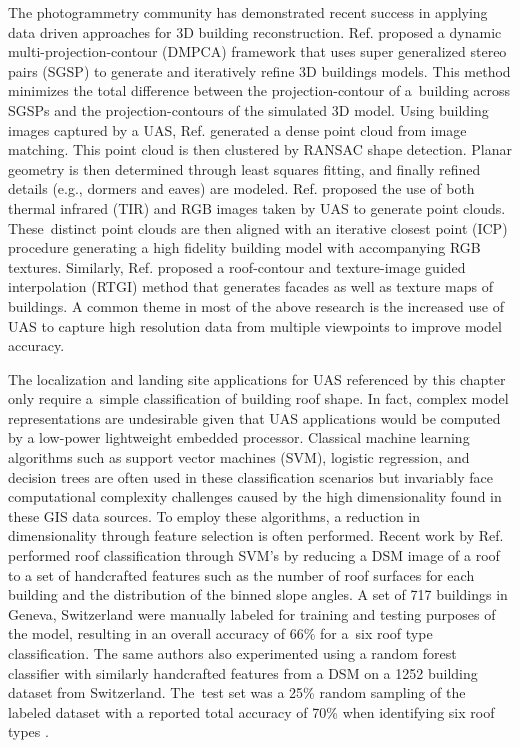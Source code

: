  {The photogrammetry community has demonstrated recent success in applying data driven approaches for 3D building reconstruction. Ref. \cite{yan_dynamic_2017} proposed a dynamic multi-projection-contour (DMPCA) framework that uses super generalized stereo pairs (SGSP) to generate and iteratively refine 3D buildings models. This method minimizes the total difference between the projection-contour of a~building across SGSPs and the projection-contours of the simulated 3D model. Using building images captured by a UAS, Ref. \cite{malihi_3d_2016} generated a dense point cloud from image matching. This point cloud is then clustered by RANSAC shape detection. Planar geometry is then determined through least squares fitting, and finally refined details (e.g., dormers and eaves) are modeled.  Ref. \cite{maset_photogrammetric_2017} proposed the use of both thermal infrared (TIR) and RGB images taken by UAS to generate point clouds. These~distinct point clouds are then aligned with an iterative closest point (ICP) procedure generating a high fidelity building model with accompanying RGB textures. Similarly,            Ref. \cite{yan_hierarchical_2017} proposed a roof-contour and texture-image guided interpolation (RTGI) method that generates facades as well as texture maps of buildings. A common theme in most of the above research is the increased use of UAS to capture high resolution data from multiple viewpoints to improve model accuracy.}
 
The localization and landing site applications for UAS referenced by this chapter only require a~simple classification of building roof shape.   In fact, complex model representations are undesirable given that UAS applications would be computed by a low-power lightweight embedded processor. Classical machine learning algorithms such as support vector machines (SVM), logistic regression, and decision trees are often used in these classification scenarios but invariably face computational complexity challenges caused by the high dimensionality found in these GIS data sources.       To employ these algorithms, a reduction in dimensionality through feature selection is often performed. Recent work by Ref. \cite{mohajeri_city-scale_2018} performed roof classification through SVM's by reducing a DSM image of a roof to a set of handcrafted features such as the number of roof surfaces for each building and the distribution of the binned slope angles. A set of 717 buildings {in Geneva, Switzerland} were manually labeled for training and testing purposes of the model, resulting in an overall accuracy of 66\% for a~six roof type classification. {The same authors also experimented using a random forest classifier with similarly handcrafted features from a DSM on a 1252 building dataset from Switzerland. The~test set was a 25\% random sampling of the labeled dataset with a reported total accuracy of  70\%  when identifying six roof types \cite{assouline_building_2017}.}


